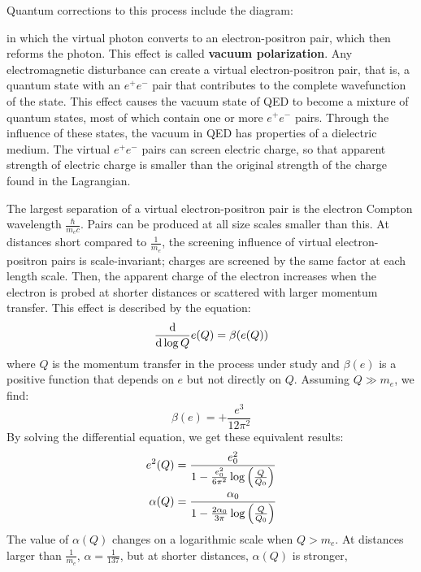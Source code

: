\documentclass[../../main/main.tex]{subfiles}
\begin{document}

Quantum corrections to this process include the diagram:


in which the virtual photon converts to an electron-positron pair, which then reforms the photon. This effect is called \textbf{vacuum polarization}. Any electromagnetic disturbance can create a virtual electron-positron pair, that is, a quantum state with an \( e^+e^- \) pair that contributes to the complete wavefunction of the state. This effect causes the vacuum state of QED to become a mixture of quantum states, most of which contain one or more \( e^+e^- \) pairs. Through the influence of these states, the vacuum in QED has properties of a dielectric medium. The virtual \( e^+e^- \) pairs can screen electric charge, so that apparent strength of electric charge is smaller than the original strength of the charge found in the Lagrangian.

The largest separation of a virtual electron-positron pair is the electron Compton wavelength \( \frac{\hbar}{m_e c} \). Pairs can be produced at all size scales smaller than this. At distances short compared to \( \frac{1}{m_e} \), the screening influence of virtual electron-positron pairs is scale-invariant; charges are screened by the same factor at each length scale. Then, the apparent charge of the electron increases when the electron is probed at shorter distances or scattered with larger momentum transfer. This effect is described by the equation:
\begin{equation}
	\dv{}{\log Q} e(Q)
	=
	\beta(e(Q))
	\label{eq:}
\end{equation}
where \( Q \) is the momentum transfer in the process under study and \( \beta(e) \) is a positive function that depends on \( e \) but not directly on \( Q \). Assuming \( Q \gg m_e \), we find:
\begin{equation}
	\beta(e)
	=
	+ \frac{e^3}{12\pi^2}
	\label{eq:}
\end{equation}
By solving the differential equation, we get these equivalent results:
\begin{align}
	e^2(Q) &= \frac{e^2_0}{1 - \frac{e^2_0}{6\pi^2}\log\qty(\frac{Q}{Q_0}) }	\\
	\alpha(Q) &= \frac{\alpha_0}{1 - \frac{2\alpha_0}{3\pi}\log\qty(\frac{Q}{Q_0}) }
\end{align}
The value of \( \alpha(Q) \) changes on a logarithmic scale when \( Q > m_e \). At distances larger than \( \frac{1}{m_e} \), \( \alpha = \frac{1}{137} \), but at shorter distances, \( \alpha(Q) \) is stronger,
\end{document}
